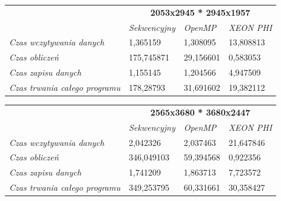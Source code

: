\documentclass[a4paper]{article}
\begin{document}
\begin{table}
\begin{tabular}{l|l|l|l|}
\cline{2-4}
                                                            & \multicolumn{3}{|c|}{\textbf{2053x2945 * 2945x1957}}       \\ \cline{2-4} 
                                                            & \textit{Sekwencyjny} & \textit{OpenMP} & \textit{XEON PHI} \\ \hline
\multicolumn{1}{|l|}{\textit{Czas wczytywania danych}}      & 1,365159             & 1,308095        & 13,808813         \\ \hline
\multicolumn{1}{|l|}{\textit{Czas obliczeń}}                & 175,745871           & 29,156601       & 0,583053          \\ \hline
\multicolumn{1}{|l|}{\textit{Czas zapisu danych}}           & 1,155145             & 1,204566        & 4,947509          \\ \hline
\multicolumn{1}{|l|}{\textit{Czas trwania całego programu}} & 178,28793            & 31,691602       & 19,382112         \\ \hline
\end{tabular}
\end{table}

\begin{table}
\begin{tabular}{l|l|l|l|}
\cline{2-4}
                                                            & \multicolumn{3}{|c|}{\textbf{2565x3680 * 3680x2447}}       \\ \cline{2-4} 
                                                            & \textit{Sekwencyjny} & \textit{OpenMP} & \textit{XEON PHI} \\ \hline
\multicolumn{1}{|l|}{\textit{Czas wczytywania danych}}      & 2,042326             & 2,037463        & 21,647846         \\ \hline
\multicolumn{1}{|l|}{\textit{Czas obliczeń}}                & 346,049103            & 59,394568       & 0,922356          \\ \hline
\multicolumn{1}{|l|}{\textit{Czas zapisu danych}}           & 1,741209             & 1,863713        & 7,723572          \\ \hline
\multicolumn{1}{|l|}{\textit{Czas trwania całego programu}} & 349,253795           & 60,331661       & 30,358427         \\ \hline
\end{tabular}
\end{table}
\end{document}
